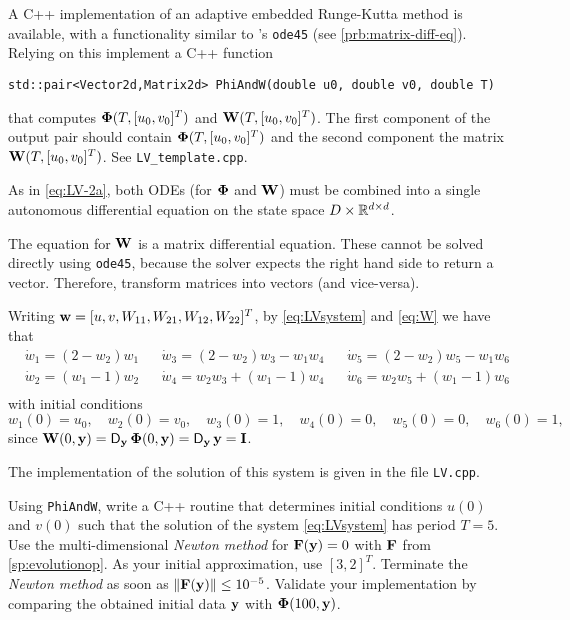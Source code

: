 \begin{problem}
\begin{subproblem}[2] \label{sp:wronski}
A C++ implementation of an adaptive embedded Runge-Kutta method is available, with
a functionality similar to \Matlab{}'s \texttt{ode45} (see \ref{prb:matrix-diff-eq}). Relying on this implement a
C++ function
\begin{lstlisting}
std::pair<Vector2d,Matrix2d> PhiAndW(double u0, double v0, double T)
\end{lstlisting}
that computes $\mathbf{\Phi}(T,[u_0,v_0]^T)$ and ${\mathbf{W}}(T,[u_0,v_0]^T)$. The first component of the output pair should contain $\mathbf{\Phi}(T,[u_0,v_0]^T)$ and the second component the matrix ${\mathbf{W}}(T,[u_0,v_0]^T)$. See \texttt{LV\_template.cpp}.
\begin{hint}
  As in \eqref{eq:LV-2a}, both ODEs (for $\mathbf{\Phi}$ and ${\mathbf{W}}$) must be combined into a
  single autonomous differential equation on the state space
  $D\times \mathbb{R}^{d\times d}$.
\end{hint}

\begin{hint}
The equation for ${\mathbf{W}}$ is a matrix differential equation. These cannot be solved directly using \texttt{ode45}, because the solver expects the right hand side to return a vector.  Therefore, transform matrices into vectors (and vice-versa).
\end{hint}
\begin{solution}
Writing ${\mathbf{w}} = [u,v,W_{11}, W_{21}, W_{12},W_{22}]^T$, by \eqref{eq:LVsystem} and \eqref{eq:W} we have that
\begin{align*}
& \dot w_1 = (2-w_2)w_1  && \dot w_3 = (2-w_2)w_3 - w_1 w_4 && \dot w_5 = (2-w_2)w_5 - w_1 w_6\\
& \dot w_2 = (w_1-1)w_2 && \dot w_4=w_2 w_3 + (w_1 -1) w_4 && \dot w_6 = w_2 w_5 + (w_1 - 1) w_6\\
\end{align*}
with initial conditions
\[
w_1(0)=u_0,\quad w_2(0)=v_0, \quad w_3(0)=1, \quad w_4(0)=0, \quad w_5(0)=0, \quad w_6(0)=1,
\]
since ${\mathbf{W}}(0,{\mathbf{y}})=\operatorname{\sf D}_{\mathbf{y}}\mathbf{\Phi}(0,{\mathbf{y}})=\operatorname{\sf D}_{\mathbf{y}} {\mathbf{y}} ={\mathbf{I}}$. 

The implementation of the solution of this system is given in the file \texttt{LV.cpp}.
\end{solution}
\end{subproblem}


\begin{subproblem}[3] \label{sp:LVperiod} Using \texttt{PhiAndW}, write a C++
  routine that determines initial conditions $u(0)$
  and $v(0)$ such that the solution of the system \eqref{eq:LVsystem} has period
  $T=5$.  Use the multi-dimensional \emph{Newton method} for ${\mathbf{F}}({\mathbf{y}})= 0$ with
  ${\mathbf{F}}$ from \ref{sp:evolutionop}. As your initial approximation, use
  $[3,2]^T$. Terminate the \emph{Newton method} as soon as
  $\left\lVert {\mathbf{F}}({\mathbf{y}}) \right\rVert \leq 10^{-5}$. Validate your implementation by comparing the
  obtained initial data ${\mathbf{y}}$ with $\mathbf{\Phi}(100,{\mathbf{y}})$.


\end{subproblem}
\end{problem}
